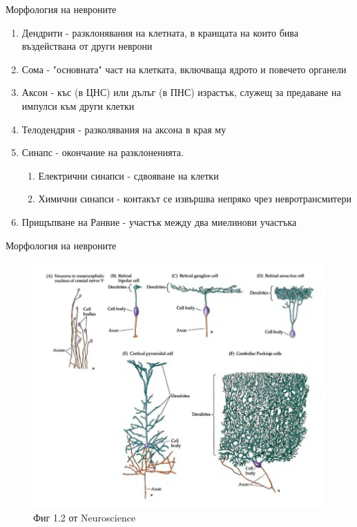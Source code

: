 \begin{frame}[t]{Морфология на невроните}
  \begin{enumerate}
    \item   Дендрити - разклонявания на клетната, в краищата на които бива въздействана от други неврони
    \item   Сома - "основната" част на клетката, включваща ядрото и повечето органели
    \item   Аксон - къс (в ЦНС) или дълъг (в ПНС) израстък, служещ за предаване на импулси към други клетки
    \item   Телодендрия - разколявания на аксона в края му
    \item   Синапс - окончание на разклоненията. 
    \begin{enumerate}
      \item   Електрични синапси - сдвояване на клетки
      \item   Химични синапси - контакът се извършва непряко чрез невротрансмитери
    \end{enumerate}
    \item   Прищъпване на Ранвие - участък между два миелинови участъка
  \end{enumerate}
\end{frame}

\begin{frame}[t]{Морфология на невроните}
  \begin{figure}[htbp!]
    \centering
    \includegraphics[width=\textwidth,height=0.7\textheight,keepaspectratio]{neuron-types.PNG}
    \caption{Фиг 1.2 от Neuroscience}
  \end{figure}
\end{frame}

